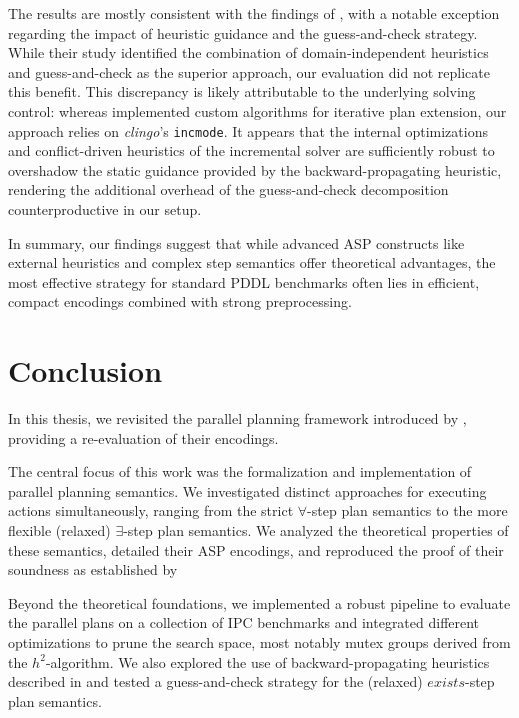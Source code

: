 \documentclass[
     11pt,                    %
     a4paper,             %
     BCOR=10mm,     %
     DIV=14,                 %
     listof=totoc,                    %
     bibliography=totoc,       %
     index=totoc,              %
     parskip            %
     twoside,
     headsepline
     ]{scrreprt}
\theoremstyle{definition}
\theoremstyle{definition}
\theoremstyle{remark}
\theoremstyle{bfnote}
\begin{document}
The results are mostly consistent with the findings of \textcite{DIMOPOULOS_2019}, with a notable exception regarding the impact of heuristic guidance and the guess-and-check strategy. While their study identified the combination of domain-independent heuristics and guess-and-check as the superior approach, our evaluation did not replicate this benefit. This discrepancy is likely attributable to the underlying solving control: whereas \textcite{DIMOPOULOS_2019} implemented custom algorithms for iterative plan extension, our approach relies on \textit{clingo}'s \texttt{incmode}. It appears that the internal optimizations and conflict-driven heuristics of the incremental solver are sufficiently robust to overshadow the static guidance provided by the backward-propagating heuristic, rendering the additional overhead of the guess-and-check decomposition counterproductive in our setup.

In summary, our findings suggest that while advanced ASP constructs like external heuristics and complex step semantics offer theoretical advantages, the most effective strategy for standard PDDL benchmarks often lies in efficient, compact encodings combined with strong preprocessing.


\chapter{Conclusion} \label{conclusion}

In this thesis, we revisited the parallel planning framework introduced by \textcite{DIMOPOULOS_2019}, providing a re-evaluation of their encodings.

The central focus of this work was the formalization and implementation of parallel planning semantics. We investigated distinct approaches for executing actions simultaneously, ranging from the strict $\forall$-step plan semantics to the more flexible (relaxed) $\exists$-step plan semantics. 
We analyzed the theoretical properties of these semantics, detailed their ASP encodings, and reproduced the proof of their soundness as established by \textcite{DIMOPOULOS_2019}

Beyond the theoretical foundations, we implemented a robust pipeline to evaluate the parallel plans on a collection of IPC benchmarks and integrated different optimizations to prune the search space, most notably mutex groups derived from the $h^2$-algorithm.
We also explored the use of backward-propagating heuristics described in \textcite{DIMOPOULOS_2019} and tested a guess-and-check strategy for the (relaxed) $exists$-step plan semantics.
\end{document}
